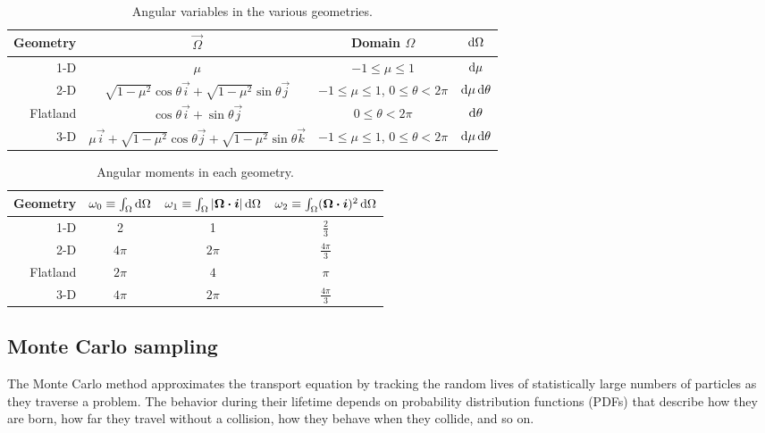 \begin{table}[htb]
  \centering
  \begin{tabular}{rccc}
\toprule
   Geometry & $\vec{\Omega}$ & Domain $\Omega$ & $\mathop{}\!\mathrm{d}\Omega$
\\ \midrule
   1-D & $\mu$ & $-1 \le \mu \le 1$ & $\mathop{}\!\mathrm{d}\mu$
   \\
   2-D & $\sqrt{1-\mu^2} \cos \theta \vec{i}
   + \sqrt{1-\mu^2} \sin \theta \vec{j}$
   & $-1 \le \mu \le 1$, $0 \le \theta < 2\pi$ & $\mathop{}\!\mathrm{d}\mu \mathop{}\!\mathrm{d} \theta$
   \\
   Flatland & $\cos \theta \vec{i} + \sin \theta \vec{j}$
   & $0 \le \theta < 2\pi$ & $\mathop{}\!\mathrm{d} \theta$
   \\
   3-D & $\mu \vec{i}
   + \sqrt{1-\mu^2} \cos \theta \vec{j}
   + \sqrt{1-\mu^2} \sin \theta \vec{k}$
   & $-1 \le \mu \le 1$, $0 \le \theta < 2\pi$ & $\mathop{}\!\mathrm{d}\mu \mathop{}\!\mathrm{d} \theta$
\\ \bottomrule
  \end{tabular}
  \caption{Angular variables in the various geometries.}
  \label{tab:angularDomain}
\end{table}

\begin{table}[htb]
  \centering
  \begin{tabular}{rccc}
\toprule
   Geometry
   & $\omega_0 \equiv \int_\Omega \mathop{}\!\mathrm{d}\Omega$
   & $\omega_1 \equiv \int_\Omega \left| \bm{\Omega}\bm{\cdot}\bm{i} \right| \mathop{}\!\mathrm{d}\Omega$
   & $\omega_2 \equiv \int_\Omega (\bm{\Omega}\bm{\cdot}\bm{i})^2 \mathop{}\!\mathrm{d}\Omega$
\\ \midrule
   1-D & 2 & 1 & $\frac{2}{3}$
   \\
   2-D & $4\pi$ & $2\pi$ & $\frac{4\pi}{3}$
   \\
   Flatland & $2\pi$ & $4$ & $\pi$
   \\
   3-D & $4\pi$ & $2\pi$ & $\frac{4\pi}{3}$
\\ \bottomrule
  \end{tabular}
  \caption{Angular moments in each geometry.}
  \label{tab:angularMoments}
\end{table}


\subsection{Monte Carlo sampling}
The Monte Carlo method approximates the transport equation by tracking the
random lives of statistically large numbers of particles as they traverse a
problem. The behavior during their lifetime depends on probability distribution
functions (PDFs) that describe how they are born, how far they travel without a
collision, how they behave when they collide, and so on. 

